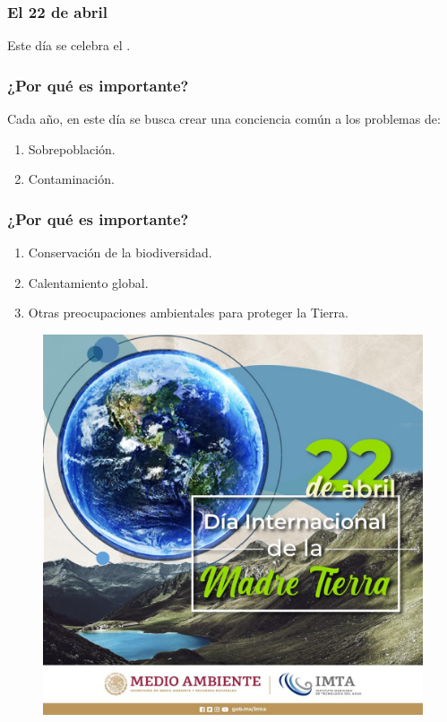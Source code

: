 \documentclass[14pt]{beamer}
\begin{document}
\begin{frame}
\frametitle{El 22 de abril}
Este día se celebra el .
\end{frame}
\begin{frame}
\frametitle{¿Por qué es importante?}
Cada año, en este día se busca crear una conciencia común a los problemas de:
\pause
{}
\begin{enumerate}[<+->]
\item Sobrepoblación.
\item Contaminación.
\seti
\end{enumerate}
\end{frame}
\begin{frame}
\frametitle{¿Por qué es importante?}
\begin{enumerate}[<+->]
\conti
\item Conservación de la biodiversidad.
\item Calentamiento global.
\item Otras preocupaciones ambientales para proteger la Tierra.
\end{enumerate}
\end{frame}
\begin{frame}
\begin{figure}
    \centering
    \includegraphics[scale=0.2]{Imagenes/dia_internacional_madre_tierra.jpg}
\end{figure}
\end{frame}
\end{document}

